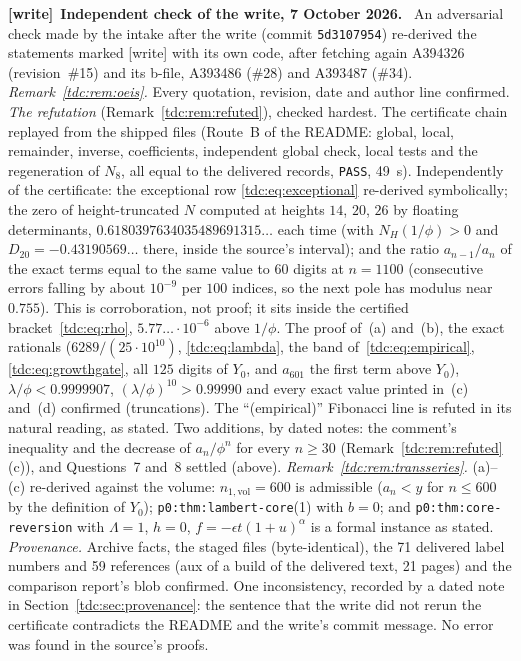 \documentclass[11pt]{article}
\theoremstyle{definition}\newtheorem{definition}[theorem]{Definition}
\theoremstyle{remark}\newtheorem{remark}[theorem]{Remark}
\newcommand{\file}[1]{\nolinkurl{#1}}
\newenvironment{writenote}[1][]{\par\smallskip\begingroup\small
 \noindent\textbf{[write]}\if\relax\detokenize{#1}\relax\else~\textbf{#1.}\fi\ }%
 {\par\endgroup\smallskip}
\begin{document}
\begin{writenote}[Independent check of the write, 7 October 2026]
An adversarial check made by the intake after the write (commit
\file{5d3107954}) re-derived the statements marked [write] with its own code,
after fetching again A394326 (revision~\#15) and its b-file, A393486
(\#28) and A393487 (\#34). \emph{Remark~\ref{tdc:rem:oeis}.} Every
quotation, revision, date and author line confirmed. \emph{The refutation}
(Remark~\ref{tdc:rem:refuted}), checked hardest. The certificate chain
replayed from the shipped files (Route~B of the README: global, local,
remainder, inverse, coefficients, independent global check, local tests and
the regeneration of $N_8$, all equal to the delivered records, \texttt{PASS},
49~s). Independently of the certificate: the exceptional row
\eqref{tdc:eq:exceptional} re-derived symbolically; the zero of
height-truncated $N$ computed at heights $14$, $20$, $26$ by floating
determinants, $0.6180397634035489691315\ldots$ each time (with
$N_H(1/\phi)>0$ and $D_{20}=-0.43190569\ldots$ there, inside the source's
interval); and the ratio $a_{n-1}/a_n$ of the exact terms equal to the same
value to $60$ digits at $n=1100$ (consecutive errors falling by about
$10^{-9}$ per $100$ indices, so the next pole has modulus near $0.755$). This
is corroboration, not proof; it sits inside the certified
bracket~\eqref{tdc:eq:rho}, $5.77\ldots\cdot10^{-6}$ above $1/\phi$. The proof of~(a) and~(b), the
exact rationals ($6289/(25\cdot10^{10})$, \eqref{tdc:eq:lambda}, the band
of~\eqref{tdc:eq:empirical}, \eqref{tdc:eq:growthgate}, all $125$ digits of
$Y_0$, and $a_{601}$ the first term above $Y_0$), $\lambda/\phi<0.9999907$,
$(\lambda/\phi)^{10}>0.99990$ and every exact value printed in~(c) and~(d)
confirmed (truncations). The ``(empirical)'' Fibonacci line is refuted in
its natural reading, as stated. Two additions, by dated notes: the comment's
inequality and the decrease of $a_n/\phi^n$ for every $n\ge30$
(Remark~\ref{tdc:rem:refuted}(c)), and Questions~7 and~8 settled (above).
\emph{Remark~\ref{tdc:rem:transseries}.} (a)--(c) re-derived against the
volume: $n_{1,\mathrm{vol}}=600$ is admissible ($a_n<y$ for $n\le600$ by the
definition of $Y_0$); \file{p0:thm:lambert-core}(1) with $b=0$; and
\file{p0:thm:core-reversion} with $\Lambda=1$, $h=0$, $f=-\epsilon
t(1+u)^\alpha$ is a formal instance as stated. \emph{Provenance.} Archive
facts, the staged files (byte-identical), the 71 delivered label numbers and
59 references (aux of a build of the delivered text, 21 pages) and the
comparison report's blob confirmed. One inconsistency, recorded by a dated
note in Section~\ref{tdc:sec:provenance}: the sentence that the write did not
rerun the certificate contradicts the README and the write's commit message.
No error was found in the source's proofs.
\end{writenote}
\end{document}
